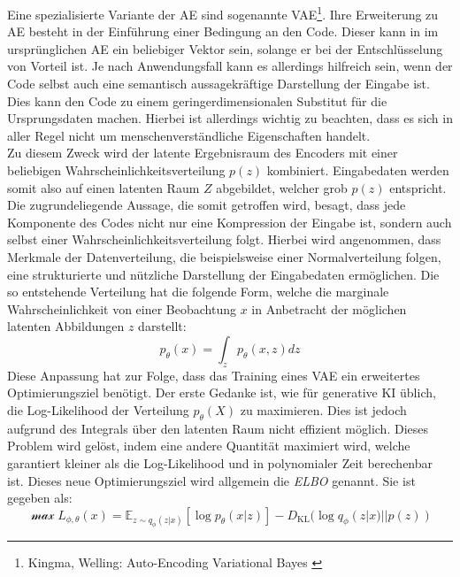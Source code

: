 Eine spezialisierte Variante der \ac{AE} sind sogenannte \ac{VAE}\footnote{
    Kingma, Welling: Auto-Encoding Variational Bayes
    \cite{kingma2013auto}
}. Ihre Erweiterung zu \ac{AE} besteht in der Einführung einer Bedingung an den Code. Dieser kann in im ursprünglichen \ac{AE} ein beliebiger Vektor sein, solange er bei der Entschlüsselung von Vorteil ist. Je nach Anwendungsfall kann es allerdings hilfreich sein, wenn der Code selbst auch eine semantisch aussagekräftige Darstellung der Eingabe ist. Dies kann den Code zu einem geringerdimensionalen Substitut für die Ursprungsdaten machen. Hierbei ist allerdings wichtig zu beachten, dass es sich in aller Regel nicht um menschenverständliche Eigenschaften handelt. \\
Zu diesem Zweck wird der latente Ergebnisraum des Encoders mit einer beliebigen Wahrscheinlichkeitsverteilung $p(z)$ kombiniert. Eingabedaten werden somit also auf einen latenten Raum $Z$ abgebildet, welcher grob $p(z)$ entspricht. \\
Die zugrundeliegende Aussage, die somit getroffen wird, besagt, dass jede Komponente des Codes nicht nur eine Kompression der Eingabe ist, sondern auch selbst einer Wahrscheinlichkeitsverteilung folgt. Hierbei wird angenommen, dass Merkmale der Datenverteilung, die beispielsweise einer Normalverteilung folgen, eine strukturierte und nützliche Darstellung der Eingabedaten ermöglichen. Die so entstehende Verteilung hat die folgende Form, welche die marginale Wahrscheinlichkeit von einer Beobachtung $x$ in Anbetracht der möglichen latenten Abbildungen $z$ darstellt:
\begin{equation}
    p_\theta(x) = \int_z p_\theta(x, z) dz
\end{equation}
Diese Anpassung hat zur Folge, dass das Training eines \ac{VAE} ein erweitertes Optimierungsziel benötigt. Der erste Gedanke ist, wie für generative \ac{KI} üblich, die Log-Likelihood der Verteilung $p_\theta(X)$ zu maximieren. Dies ist jedoch aufgrund des Integrals über den latenten Raum nicht effizient möglich. Dieses Problem wird gelöst, indem eine andere Quantität maximiert wird, welche garantiert kleiner als die Log-Likelihood und in polynomialer Zeit berechenbar ist. Dieses neue Optimierungsziel wird allgemein die \textit{\ac{ELBO}} genannt. Sie ist gegeben als:
\begin{equation}
    \mathcal \max L_{\phi, \theta}(x) = \mathbb E_{z \sim q_{\phi}(z|x)}
    \left [
        \log p_\theta(x|z)
    \right ]
    - D_\text{KL} (\log q_{\phi}(z|x) || p(z))
\end{equation}

